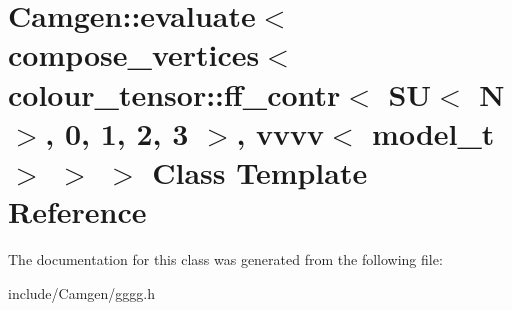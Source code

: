 \hypertarget{a00171}{\section{Camgen\-:\-:evaluate$<$ compose\-\_\-vertices$<$ colour\-\_\-tensor\-:\-:ff\-\_\-contr$<$ S\-U$<$ N $>$, 0, 1, 2, 3 $>$, vvvv$<$ model\-\_\-t $>$ $>$ $>$ Class Template Reference}
\label{a00171}
}


The documentation for this class was generated from the following file\-:\begin{DoxyCompactItemize}
\item 
include/\-Camgen/gggg.\-h\end{DoxyCompactItemize}
